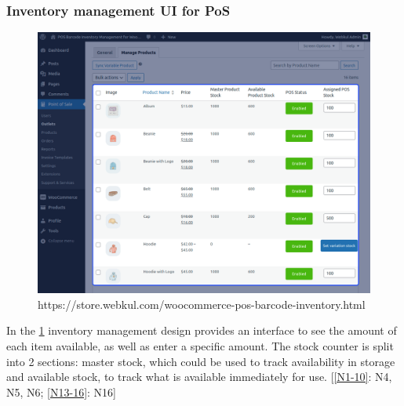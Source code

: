 \documentclass{article}
\begin{document}
\subsubsection{Inventory management UI for PoS}
\begin{figure}[H]
    \centering
    \includegraphics[width=0.9\linewidth]{HCI/images/inventory_management_UI.png}
    \caption{https://store.webkul.com/woocommerce-pos-barcode-inventory.html}
    \label{fig:Inv_management}
\end{figure}
\noindent
In the \cref{fig:Inv_management} inventory management design provides an interface to see the amount of each item available, as well as enter a specific amount. The stock counter is split into 2 sections: master stock, which could be used to track availability in storage and available stock, to track what is available immediately for use. [\cref{N1-10}: N4, N5, N6; \cref{N13-16}: N16]
\end{document}
